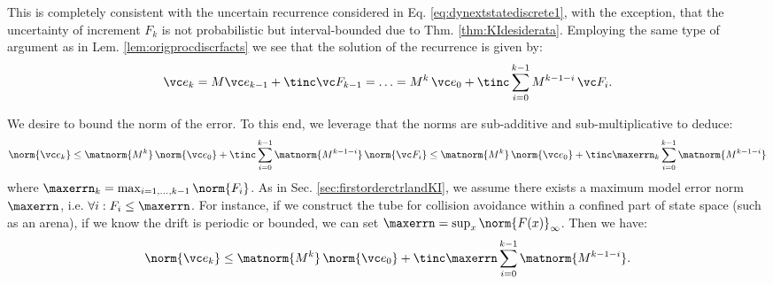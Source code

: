 This is completely consistent with the uncertain recurrence considered in Eq. \ref{eq:dynextstatediscrete1}, with the exception, that the uncertainty of increment $F_k$ is not probabilistic but interval-bounded due to Thm. \ref{thm:KIdesiderata}. Employing the same type of argument as in Lem. \ref{lem:origprocdiscrfacts} we see that the solution of the recurrence is given by:
\begin{equation}
	\vc e_k = M \vc e_{k-1} + \tinc \vc F_{k-1} = \ldots = M^k \, \vc e_0 + \tinc \sum_{i=0}^{k-1} M^{k-1-i} \, \vc F_i	.	
\end{equation}		 

%

We desire to bound the  norm of the error. To this end, we leverage that the norms are sub-additive and sub-multiplicative to deduce: 
%
%
\begin{equation}
	\norm{\vc e_k} \leq   \matnorm{M^{k}} \, \norm{\vc e_0} + \tinc \sum_{i=0}^{k-1}  \matnorm{M^{k-1-i}} \, \norm{\vc F_i}		\leq \matnorm{M^{k}} \, \norm{\vc e_0} + \tinc \maxerrn_k	 \sum_{i=0}^{k-1}  \matnorm{M^{k-1-i}}
\end{equation}
where $\maxerrn_k	= \max_{i=1,...,k-1} \norm{F_i}$.
As in Sec. \ref{sec:firstorderctrlandKI}, we assume there exists a maximum model error norm $\maxerrn$, i.e. $\forall i: F_i \leq \maxerrn$. 
For instance, if we construct the tube for collision avoidance within a confined part of state space (such as an arena), if we know the drift is periodic or bounded, we can set $\maxerrn = \sup_{x} \norm{F(x)}_{\infty}$. 
Then we have: \vspace{-1em}
\begin{equation}
	\norm{\vc e_k} \leq   \matnorm{M^{k}} \, \norm{\vc e_0} + \tinc \maxerrn \sum_{i=0}^{k-1}  \matnorm{M^{k-1-i}}.
\end{equation}

